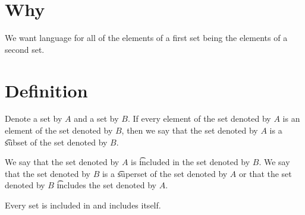 
\section*{Why}

We want language for all of the elements of a first set being the elements of a second set.

\section*{Definition}

Denote a set by $A$ and a set by $B$.
If every element of the set denoted by $A$ is an element of the set denoted by $B$, then we say that the set denoted by $A$ is a \t{subset} of the set denoted by $B$.

We say that the set denoted by $A$ is \t{included} in the set denoted by $B$.
We say that the set denoted by $B$ is a \t{superset} of the set denoted by $A$ or that the set denoted by $B$ \t{includes} the set denoted by $A$.

Every set is included in and includes itself.


